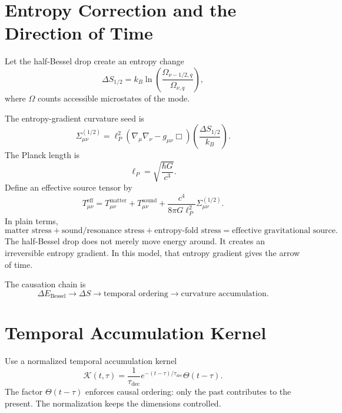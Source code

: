 \documentclass[11pt,a4paper]{article}
\renewcommand{\boxed}[1]{#1}
\newcommand{\Teff}{T_{\mu\nu}^{\mathrm{eff}}}
\newcommand{\Tmat}{T_{\mu\nu}^{\mathrm{matter}}}
\newcommand{\Tsound}{T_{\mu\nu}^{\mathrm{sound}}}
\newcommand{\Sigmahalf}{\Sigma_{\mu\nu}^{(1/2)}}
\begin{document}
\section{Entropy Correction and the Direction of Time}

Let the half-Bessel drop create an entropy change
\begin{equation}
 \Delta S_{1/2}=k_B\ln\left(\frac{\Omega_{\nu-1/2,q}}{\Omega_{\nu,q}}\right),
\label{eq:delta-s}
\end{equation}
where $\Omega$ counts accessible microstates of the mode.

The entropy-gradient curvature seed is
\begin{equation}
\boxed{
\Sigmahalf
=
\ell_P^2
\left(\nabla_\mu\nabla_\nu-g_{\mu\nu}\Box\right)
\left(\frac{\Delta S_{1/2}}{k_B}\right).
}
\label{eq:sigma-half}
\end{equation}
The Planck length is
\begin{equation}
 \ell_P=\sqrt{\frac{\hbar G}{c^3}}.
\label{eq:planck-length}
\end{equation}
Define an effective source tensor by
\begin{equation}
\boxed{
\Teff
=
\Tmat+
\Tsound+
\frac{c^4}{8\pi G\ell_P^2}\Sigmahalf.
}
\label{eq:t-eff}
\end{equation}
In plain terms,
\begin{equation}
\boxed{
\text{matter stress}
+
\text{sound/resonance stress}
+
\text{entropy-fold stress}
=
\text{effective gravitational source}.
}
\label{eq:source-plain}
\end{equation}
The half-Bessel drop does not merely move energy around. It creates an irreversible entropy gradient. In this model, that entropy gradient gives the arrow of time.

The causation chain is
\begin{equation}
\boxed{
\Delta E_{\mathrm{Bessel}}
\rightarrow \Delta S\rightarrow
\text{temporal ordering}\rightarrow\text{curvature accumulation}.
}
\label{eq:entropy-causation}
\end{equation}

\section{Temporal Accumulation Kernel}

Use a normalized temporal accumulation kernel
\begin{equation}
\boxed{
\mathcal{K}(t,\tau)=\frac{1}{\tau_{\mathrm{dec}}}e^{-(t-\tau)/\tau_{\mathrm{dec}}}\Theta(t-\tau).
}
\label{eq:kernel}
\end{equation}
The factor $\Theta(t-\tau)$ enforces causal ordering: only the past contributes to the present. The normalization keeps the dimensions controlled.
\end{document}
